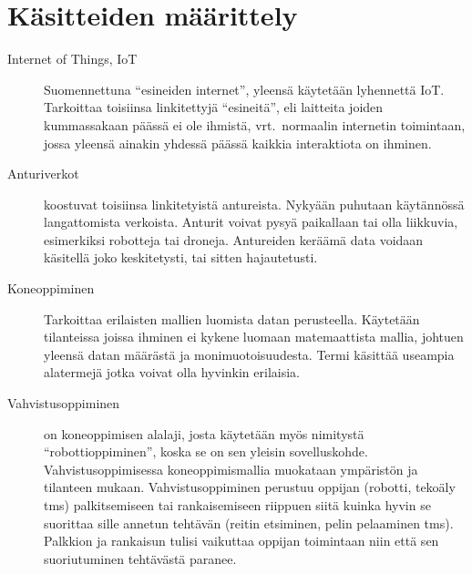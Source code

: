 \section{Käsitteiden määrittely}

\begin{description}

  \item [Internet of Things, IoT] 
    Suomennettuna ``esineiden internet'', yleensä
    käytetään lyhennettä IoT. Tarkoittaa toisiinsa linkitettyjä ``esineitä'', eli
    laitteita joiden kummassakaan päässä ei ole ihmistä, vrt.\ normaalin internetin
    toimintaan, jossa yleensä ainakin yhdessä päässä kaikkia interaktiota on
    ihminen.

  \item [Anturiverkot] koostuvat toisiinsa linkitetyistä
    antureista. Nykyään puhutaan käytännössä langattomista verkoista.
    Anturit voivat pysyä paikallaan tai olla liikkuvia, esimerkiksi robotteja
    tai droneja. Antureiden keräämä data voidaan käsitellä joko keskitetysti,
    tai sitten hajautetusti.~\cite{Chong2003,Tubaishat2003}

  \item [Koneoppiminen] 
    Tarkoittaa erilaisten mallien luomista datan perusteella. Käytetään
    tilanteissa joissa ihminen ei kykene luomaan matemaattista mallia, johtuen
    yleensä datan määrästä ja monimuotoisuudesta. Termi käsittää useampia
    alatermejä jotka voivat olla hyvinkin erilaisia.

  \item [Vahvistusoppiminen] on koneoppimisen alalaji, josta käytetään myös
    nimitystä ``robottioppiminen'', koska se on sen yleisin sovelluskohde.
    Vahvistusoppimisessa koneoppimismallia muokataan ympäristön ja tilanteen
    mukaan. Vahvistusoppiminen perustuu oppijan (robotti, tekoäly tms)
    palkitsemiseen tai rankaisemiseen riippuen siitä kuinka hyvin se suorittaa
    sille annetun tehtävän (reitin etsiminen, pelin pelaaminen tms). Palkkion
    ja rankaisun tulisi vaikuttaa oppijan toimintaan niin että sen
    suoriutuminen tehtävästä paranee.~\cite{Kaelbling1996}

\end{description}

